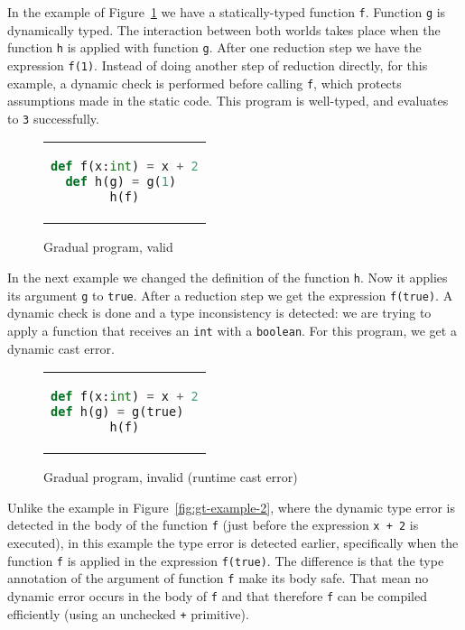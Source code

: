 \documentclass{article}
\newcommand\icode[1]{\texttt{#1}}
\begin{document}
In the example of Figure~\ref{fig:gt-example-5} we have a statically-typed function \icode{f}. Function \icode{g} is dynamically typed. The interaction between both worlds takes place when the function \icode{h} is applied with function \icode{g}. After one reduction step we have the expression \icode{f(1)}. Instead of doing another step of reduction directly,  for this example, a dynamic check is performed before calling \icode{f}, which protects assumptions made in the static code. This program is well-typed, and evaluates to \icode{3} successfully. 
\begin{figure}[!htbp]
\begin{center}
\begin{tabular}{c}
\begin{lstlisting}[language=Python]
def f(x:int) = x + 2
def h(g) = g(1)	
h(f)
\end{lstlisting}
\end{tabular}
\end{center}
\caption{Gradual program, valid}%
\label{fig:gt-example-5}%
\end{figure}

In the next example we changed the definition of the function \icode{h}. Now it applies its argument \icode{g} to \icode{true}. After a reduction step we get the expression \icode{f(true)}. A dynamic check is done and a type inconsistency is detected: we are trying to apply a function that receives an \icode{int} with a \icode{boolean}. For this program, we get a dynamic cast error. 
\begin{figure}[!htbp]
\begin{center}
\begin{tabular}{c}
\begin{lstlisting}[language=Python]
def f(x:int) = x + 2
def h(g) = g(true)	
h(f)
\end{lstlisting}
\end{tabular}
\end{center}
\caption{Gradual program, invalid (runtime cast error)}%
\label{fig:gt-example-6}%
\end{figure}  
Unlike the example in Figure~\ref{fig:gt-example-2}, where the dynamic type error is detected in the body of the function \icode{f} (just before the expression \icode{x + 2} is executed), in this example the type error is detected earlier, specifically when the function \icode{f} is applied in the expression \icode{f(true)}. The difference is that the type annotation of the argument of function \icode{f} make its body safe. That mean no dynamic error occurs in the body of \icode{f} and that therefore \icode{f} can be compiled efficiently (using an unchecked \icode{+} primitive).
\end{document}
